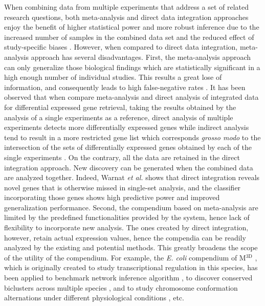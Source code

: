 %
When combining data from multiple experiments that address a set of related
research questions, both meta-analysis and direct data integration approaches
enjoy the benefit of higher statistical power and more robust inference due to
the increased number of samples in the combined data set and the reduced effect
of study-specific biases \cite{Sutton2001, Xu2005, Warnat2005}.
%
%
However, when compared to direct data integration, meta-analysis approach has
several disadvantages.
%
First, the meta-analysis approach can only generalize those biological
findings which are statistically significant in a high enough number
of individual studies.  This results a great lose of information, and
consequently leads to high false-negative rates \cite{Lazar2012, Xu2008}.
%
It has been observed that when compare meta-analysis and direct analysis of
integrated data for differential expressed gene retrieval, taking the results
obtained by the analysis of a single experiments as a reference, direct analysis
of multiple experiments detects more differentially expressed genes while
indirect analysis tend to result in a more restricted gene list which
corresponds \textit{grosso modo} to the intersection of the sets of
differentially expressed genes obtained by each of the single experiments
\cite{Fierro2008}.
%
On the contrary, all the data are retained in the direct integration approach.
New discovery can be generated when the combined data are analyzed together.
%
Indeed, Warnat \textit{et al.} \cite{Warnat2005} shows that direct integration
reveals novel genes that is otherwise missed in single-set analysis, and the
classifier incorporating those genes shows high predictive power and improved
generalization performance.
%
Second, the compendium based on meta-analysis are limited by the predefined
functionalities provided by the system, hence lack of flexibility to incorporate
new analysis.  
%
The ones created by direct integration, however, retain actual expression
values, hence the compendia can be readily analyzed by the existing and
potential methods.  This greatly broadens the scope of the utility of the
compendium.
%
For example, the \textit{E. coli} compendium of M$^{\textrm{3D}}$
\cite{Faith2008}, which is originally created to study transcriptional
regulation in this species, has been applied to benchmark network inference
algorithm \cite{Marbach2012}, to discover conserved biclusters across multiple
species \cite{Kacmarczyk2011}, and to study chromosome conformation alternations
under different physiological conditions \cite{Ma2013}, etc.
%


